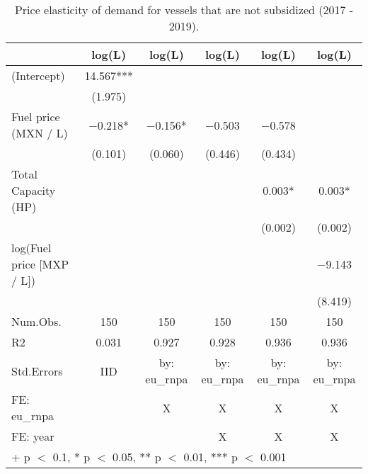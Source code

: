 \begin{table}

\caption{\label{tab:}Price elasticity of demand for vessels that are not subsidized (2017 - 2019).}
\centering
\begin{tabular}[t]{lccccc}
\toprule
  & log(L) & log(L)  & log(L)   & log(L)    & log(L)    \\
\midrule
(Intercept) & \num{14.567}*** &  &  &  & \\
 & (\num{1.975}) &  &  &  & \\
Fuel price (MXN / L) & \num{-0.218}* & \num{-0.156}* & \num{-0.503} & \num{-0.578} & \\
 & (\num{0.101}) & (\num{0.060}) & (\num{0.446}) & (\num{0.434}) & \\
Total Capacity (HP) &  &  &  & \num{0.003}* & \num{0.003}*\\
 &  &  &  & (\num{0.002}) & (\num{0.002})\\
log(Fuel price [MXP / L]) &  &  &  &  & \num{-9.143}\\
 &  &  &  &  & (\num{8.419})\\
\midrule
Num.Obs. & \num{150} & \num{150} & \num{150} & \num{150} & \num{150}\\
R2 & \num{0.031} & \num{0.927} & \num{0.928} & \num{0.936} & \num{0.936}\\
Std.Errors & IID & by: eu\_rnpa & by: eu\_rnpa & by: eu\_rnpa & by: eu\_rnpa\\
FE: eu_rnpa &  & X & X & X & X\\
FE: year &  &  & X & X & X\\
\bottomrule
\multicolumn{6}{l}{\rule{0pt}{1em}+ p $<$ 0.1, * p $<$ 0.05, ** p $<$ 0.01, *** p $<$ 0.001}\\
\end{tabular}
\end{table}
